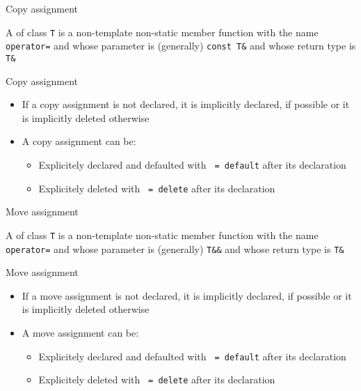 \begin{frame}{Copy assignment}{}
  \begin{definition}
    A  of class \lstinline!T! is a non-template non-static member function with the name \lstinline!operator=! and whose parameter is (generally) \lstinline!const T&! and whose return type is \lstinline!T&!
  \end{definition}

  \begin{block}{Copy assignment}
    \begin{itemize}
    \item
      If a copy assignment is not declared, it is implicitly declared, if possible or it is implicitly deleted otherwise
    \item
      A copy assignment can be:
      \begin{itemize}
      \item
        Explicitely declared and defaulted with \lstinline! = default! after its declaration
      \item
        Explicitely deleted with \lstinline! = delete! after its declaration
      \end{itemize}
    \end{itemize}
  \end{block}
\end{frame}

\begin{frame}{Move assignment}{}
  \begin{definition}
    A  of class \lstinline!T! is a non-template non-static member function with the name \lstinline!operator=! and whose parameter is (generally) \lstinline!T&&! and whose return type is \lstinline!T&!
  \end{definition}

  \begin{block}{Move assignment}
    \begin{itemize}
    \item
      If a move assignment is not declared, it is implicitly declared, if possible or it is implicitly deleted otherwise
    \item
      A move assignment can be:
      \begin{itemize}
      \item
        Explicitely declared and defaulted with \lstinline! = default! after its declaration
      \item
        Explicitely deleted with \lstinline! = delete! after its declaration
      \end{itemize}
    \end{itemize}
  \end{block}
\end{frame}


